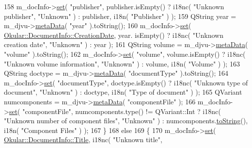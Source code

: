 \begin{DoxyCode}
158         m\_docInfo->\hyperlink{classOkular_1_1DocumentInfo_a8bd5403394ab192f1103cbf2a8e48d9b}{set}( \textcolor{stringliteral}{"publisher"}, publisher.isEmpty() ? i18nc( \textcolor{stringliteral}{"Unknown publisher"}, \textcolor{stringliteral}{"Unknown"} ) : 
      publisher, i18n( \textcolor{stringliteral}{"Publisher"} ) );
159         QString year = m\_djvu->\hyperlink{classKDjVu_ae1a73203fc07dc0c81996810ca2f7ae3}{metaData}( \textcolor{stringliteral}{"year"} ).toString();
160         m\_docInfo->\hyperlink{classOkular_1_1DocumentInfo_a8bd5403394ab192f1103cbf2a8e48d9b}{set}( \hyperlink{classOkular_1_1DocumentInfo_a3a6e5f7fb246e29bcb2e830b6f770791a58a72aeacd3cb08e85d0f9f19b2fe83a}{Okular::DocumentInfo::CreationDate}, year.
      isEmpty() ? i18nc( \textcolor{stringliteral}{"Unknown creation date"}, \textcolor{stringliteral}{"Unknown"} ) : year );
161         QString volume = m\_djvu->\hyperlink{classKDjVu_ae1a73203fc07dc0c81996810ca2f7ae3}{metaData}( \textcolor{stringliteral}{"volume"} ).toString();
162         m\_docInfo->\hyperlink{classOkular_1_1DocumentInfo_a8bd5403394ab192f1103cbf2a8e48d9b}{set}( \textcolor{stringliteral}{"volume"}, volume.isEmpty() ? i18nc( \textcolor{stringliteral}{"Unknown volume information"}, \textcolor{stringliteral}{"Unknown"} ) : 
      volume, i18n( \textcolor{stringliteral}{"Volume"} ) );
163         QString doctype = m\_djvu->\hyperlink{classKDjVu_ae1a73203fc07dc0c81996810ca2f7ae3}{metaData}( \textcolor{stringliteral}{"documentType"} ).toString();
164         m\_docInfo->\hyperlink{classOkular_1_1DocumentInfo_a8bd5403394ab192f1103cbf2a8e48d9b}{set}( \textcolor{stringliteral}{"documentType"}, doctype.isEmpty() ? i18nc( \textcolor{stringliteral}{"Unknown type of document"}, \textcolor{stringliteral}{"Unknown"}
       ) : doctype, i18n( \textcolor{stringliteral}{"Type of document"} ) );
165         QVariant numcomponents = m\_djvu->\hyperlink{classKDjVu_ae1a73203fc07dc0c81996810ca2f7ae3}{metaData}( \textcolor{stringliteral}{"componentFile"} );
166         m\_docInfo->\hyperlink{classOkular_1_1DocumentInfo_a8bd5403394ab192f1103cbf2a8e48d9b}{set}( \textcolor{stringliteral}{"componentFile"}, numcomponents.type() != QVariant::Int ? i18nc( \textcolor{stringliteral}{"Unknown number
       of component files"}, \textcolor{stringliteral}{"Unknown"} ) : numcomponents.\hyperlink{namespaceQTest_a861302f3f44f1ae8461d2752a3e3813c}{toString}(), i18n( \textcolor{stringliteral}{"Component Files"} ) );
167     \}
168     \textcolor{keywordflow}{else}
169     \{
170         m\_docInfo->\hyperlink{classOkular_1_1DocumentInfo_a8bd5403394ab192f1103cbf2a8e48d9b}{set}( \hyperlink{classOkular_1_1DocumentInfo_a3a6e5f7fb246e29bcb2e830b6f770791ae400626d63f14b61c55bd22aca9481e0}{Okular::DocumentInfo::Title}, i18nc( \textcolor{stringliteral}{"Unknown title"}, \textcolor{stringliteral}{
}
\end{DoxyCode}
